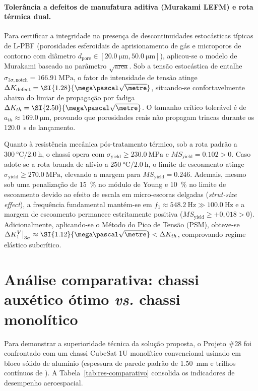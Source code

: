 \paragraph*{Tolerância a defeitos de manufatura aditiva (Murakami LEFM) e rota térmica dual.}
Para certificar a integridade na presença de descontinuidades estocásticas típicas de L-PBF (porosidades esferoidais de aprisionamento de gás e microporos de contorno com diâmetro $d_{\text{pore}} \in [\SI{20.0}{\micro\metre}, \SI{50.0}{\micro\metre}]$), aplicou-se o modelo de Murakami baseado no parâmetro $\sqrt{\text{area}}$. Sob a tensão estocástica de entalhe $\sigma_{3\sigma,\text{notch}} = \SI{166.91}{\mega\pascal}$, o fator de intensidade de tensão atinge $\Delta K_{\text{defect}} = \SI{1.28}{\mega\pascal\sqrt{\metre}}$, situando-se confortavelmente abaixo do limiar de propagação por fadiga $\Delta K_{th} = \SI{2.50}{\mega\pascal\sqrt{\metre}}$. O tamanho crítico tolerável é de $a_{th} \approx \SI{169.0}{\micro\metre}$, provando que porosidades reais não propagam trincas durante os \SI{120.0}{\second} de lançamento.

Quanto à resistência mecânica pós-tratamento térmico, sob a rota padrão a $\SI{300}{\celsius} / \SI{2.0}{\hour}$, o chassi opera com $\sigma_{\text{yield}} \ge \SI{230.0}{\mega\pascal}$ e $MS_{\text{yield}} = \num{+0.102} > 0$. Caso adote-se a rota branda de alívio a $\SI{250}{\celsius} / \SI{2.0}{\hour}$, o limite de escoamento atinge $\sigma_{\text{yield}} \ge \SI{270.0}{\mega\pascal}$, elevando a margem para $MS_{\text{yield}} = \num{+0.246}$. Ademais, mesmo sob uma penalização de \SI{15}{\percent} no módulo de Young e \SI{10}{\percent} no limite de escoamento devido ao efeito de escala em micro-escoras delgadas (\textit{strut-size effect}), a frequência fundamental mantém-se em $f_1 \approx \SI{548.2}{\hertz} \gg \SI{100.0}{\hertz}$ e a margem de escoamento permanece estritamente positiva ($MS_{\text{yield}} \ge +0{,}018 > 0$). Adicionalmente, aplicando-se o Método do Pico de Tensão (PSM), obteve-se $\Delta K_1^V\big|_{3\sigma} \approx \SI{1.12}{\mega\pascal\sqrt{\metre}} < \Delta K_{th}$, comprovando regime elástico subcrítico.

\section{Análise comparativa: chassi auxético ótimo \textit{vs.} chassi monolítico}
\label{sec:res-comparativo}

Para demonstrar a superioridade técnica da solução proposta, o Projeto \#28 foi confrontado com um chassi CubeSat 1U monolítico convencional usinado em bloco sólido de alumínio (espessura de parede padrão de \SI{1.50}{\milli\metre} e trilhos contínuos de \rail{}). A Tabela~\ref{tab:res-comparativo} consolida os indicadores de desempenho aeroespacial.

